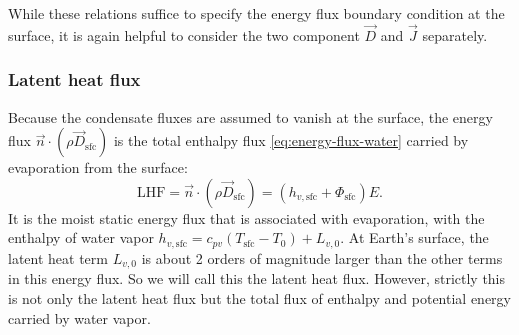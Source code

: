 \documentclass{report}
\begin{document}
While these relations suffice to specify the energy flux boundary condition at the surface, it is again helpful to consider the two component $\vec{D}$ and $\vec{J}$ separately. 

\subsubsection{Latent heat flux} Because the condensate fluxes are assumed to vanish at the surface, the energy flux $\vec{n} \cdot (\rho \vec{D}_{\mathrm{sfc}})$ is the total enthalpy flux \eqref{eq:energy-flux-water} carried by evaporation from the surface:
\begin{equation}\label{e:sfc_LHF}
     \mathrm{LHF} = \vec{n} \cdot (\rho \vec{D}_{\mathrm{sfc}})   = (h_{v, \mathrm{sfc}} + \Phi_\mathrm{sfc}) E.
\end{equation}
It is the moist static energy flux that is associated with evaporation, with the enthalpy of water vapor $h_{v, \mathrm{sfc}} = c_{pv} (T_\mathrm{sfc}-T_0) + L_{v,0}$. At Earth's surface, the latent heat term $L_{v,0}$ is about 2 orders of magnitude larger than the other terms in this energy flux. So we will call this the latent heat flux. However, strictly this is not only the latent heat flux but the total flux of enthalpy and potential energy carried by water vapor.
\end{document}
